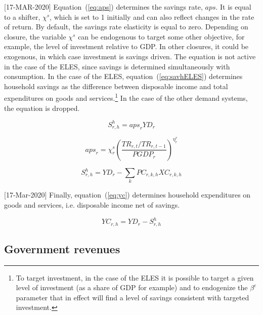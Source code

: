 \documentclass[11pt,letterpaper]{report}
\begin{document}
[17-MAR-2020] Equation~(\ref{eq:aps}) determines the savings rate, $\mathit{aps}$.
It is equal to a shifter, $\chi^s$, which is set to 1 initially
and can also reflect changes in the rate of return. By default,
the savings rate elasticity is equal to zero.
Depending on closure, the variable $\chi^s$ can be endogenous to target some other objective,
for example, the level of investment relative to GDP. In other closures, it
could be exogenous, in which case investment is savings driven.
The equation is not active in the case of
the ELES, since savings is determined simultaneously with
consumption. In the case of the ELES, equation~(\ref{eq:savhELES}) determines
household savings as the difference between disposable income and total
expenditures on goods and services.\footnote{To target investment, in the case
of the ELES it is possible to target a given level of investment (as a share of
GDP for example) and to endogenize the $\beta^c$ parameter that in effect will
find a level of savings consistent with targeted investment.} In the case of the
other demand systems, the equation is dropped.

\begin{equation}
\label{eq:savh}
S^h_{r,h} = \mathit{aps}_r \mathit{YD}_{r}
\end{equation}

\begin{equation}
\label{eq:aps}
\mathit{aps}_r = \chi^s_r \left(
\frac{\mathit{TR}_{r,t} / \mathit{TR}_{r,t-1}} {\mathit{PGDP}_r}
\right)^{\eta^s_r}
\end{equation}

\begin{equation}
\label{eq:savhELES}
S^h_{r,h} = \mathit{YD}_r - \sum_k{ \mathit{PC}_{r,k,h} \mathit{XC}_{r,k,h} }
\end{equation}

[17-Mar-2020] Finally, equation~(\ref{eq:yc}) determines household expenditures on
goods and services, i.e. disposable income net of savings.

\begin{equation}
\label{eq:yc}
\mathit{YC}_{r,h} = \mathit{YD}_{r} - S^h_{r,h}
\end{equation}

\subsection{Government revenues}
\end{document}
